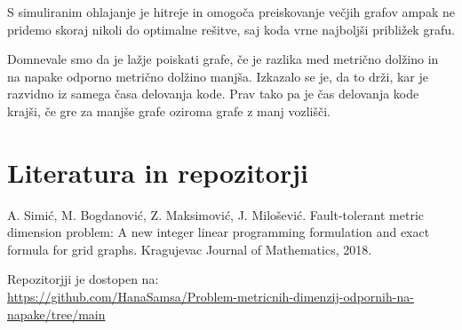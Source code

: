 \documentclass[12pt]{article}
\begin{document}
S simuliranim ohlajanje je hitreje in omogoča preiskovanje večjih grafov ampak ne pridemo skoraj nikoli 
do optimalne rešitve, saj koda vrne najboljši približek grafu.

Domnevale smo da je lažje poiskati grafe, če je razlika med metrično dolžino in na napake odporno metrično
dolžino manjša. Izkazalo se je, da to drži, kar je razvidno iz samega časa delovanja kode. Prav tako pa je
čas delovanja kode krajši, če gre za manjše grafe oziroma grafe z manj vozlišči. 


\section{Literatura in repozitorji}

A. Simić, M. Bogdanović, Z. Maksimović, J. Milošević. Fault-tolerant metric dimension problem: A new integer linear programming 
formulation and exact formula for grid graphs. Kragujevac Journal of Mathematics, 2018.

Repozitorjji je dostopen na: \\
 \url{https://github.com/HanaSamsa/Problem-metricnih-dimenzij-odpornih-na-napake/tree/main}
\end{document}
